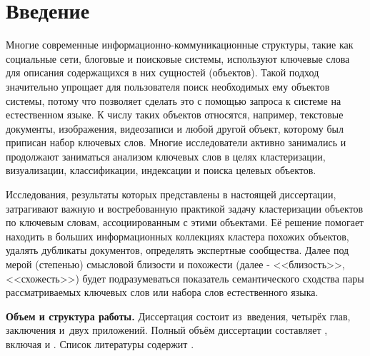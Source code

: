 \chapter*{Введение}							%
\nocite{*}
Многие современные информационно-коммуникационные структуры, такие как социальные сети, блоговые и поисковые системы, используют ключевые слова для описания содержащихся в них сущностей (объектов). Такой подход значительно упрощает для пользователя поиск необходимых ему объектов системы, потому что позволяет сделать это с помощью запроса к системе на естественном языке. К числу таких объектов относятся, например, текстовые документы, изображения, видеозаписи и любой другой объект, которому был приписан набор ключевых слов. Многие исследователи активно занимались и продолжают заниматься анализом ключевых слов в целях кластеризации, визуализации, классификации, индексации и поиска целевых объектов.

Исследования, результаты которых представлены в настоящей диссертации, затрагивают важную и востребованную практикой задачу кластеризации объектов по ключевым словам, ассоциированным с этими объектами. Её решение помогает находить в больших информационных коллекциях кластера похожих объектов, удалять дубликаты документов, определять экспертные сообщества. Далее под мерой (степенью) смысловой близости и похожести (далее - <<близость>>, <<схожесть>>) будет подразумеваться показатель семантического сходства пары рассматриваемых ключевых слов или набора слов естественного языка.




\newcommand{\actuality}{}
\newcommand{\progress}{}
\newcommand{\aim}{{\textbf\aimTXT}}
\newcommand{\tasks}{\textbf{\tasksTXT} }
\newcommand{\novelty}{\textbf{\noveltyTXT}}
\newcommand{\influence}{\textbf{\influenceTXT}}
\newcommand{\methods}{\textbf{\methodsTXT}}
\newcommand{\defpositions}{\textbf{\defpositionsTXT}}
\newcommand{\reliability}{\textbf{\reliabilityTXT}}
\newcommand{\probation}{\textbf{\probationTXT}}
\newcommand{\contribution}{\textbf{\contributionTXT}}
\newcommand{\publications}{\textbf{\publicationsTXT}}



\textbf{Объем и структура работы.} Диссертация состоит из~введения, четырёх глав, заключения и~двух приложений.
%
Полный объём диссертации составляет
, включая
 и
.   Список литературы содержит  
.
